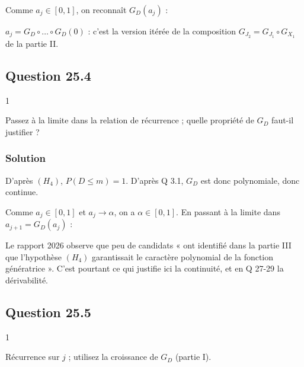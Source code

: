 \documentclass[11pt,a4paper]{article}
\newcommand{\equationajustee}[1]{%
  \sbox{\boiteequation}{$\displaystyle #1$}%
  \ifdim\wd\boiteequation>\linewidth
    \[\resizebox{\linewidth}{!}{\usebox{\boiteequation}}\]%
  \else
    \[#1\]%
  \fi}
\begin{document}
Comme \(a_j\in[0,1]\), on reconnaît \(G_D(a_j)\) :

\equationajustee{\boxed{a_{j+1}=G_D(a_j)}}

\begin{methode}

\(a_j=G_D\circ\dots\circ G_D(0)\) : c'est la version itérée de la composition \(G_{J_2}=G_{J_1}\circ G_{X_1}\) de la partie II.

\end{methode}

\hypertarget{question-25.4}{%
\subsection{Question 25.4}\label{question-25.4}}

\begin{indication}{1}

Passez à la limite dans la relation de récurrence ; quelle propriété de \(G_D\) faut-il justifier ?

\end{indication}

\hypertarget{solution-58}{%
\subsubsection{Solution}\label{solution-58}}

D'après \((H_4)\), \(P(D\le m)=1\). D'après Q 3.1, \(G_D\) est donc polynomiale, donc continue.

Comme \(a_j\in[0,1]\) et \(a_j\to\alpha\), on a \(\alpha\in[0,1]\). En passant à la limite dans \(a_{j+1}=G_D(a_j)\) :

\equationajustee{\boxed{\alpha=G_D(\alpha)}}

\begin{jury}

Le rapport 2026 observe que peu de candidats « ont identifié dans la partie III que l'hypothèse \((H_4)\) garantissait le caractère polynomial de la fonction génératrice ».
C'est pourtant ce qui justifie ici la continuité, et en Q 27-29 la dérivabilité.

\end{jury}

\hypertarget{question-25.5}{%
\subsection{Question 25.5}\label{question-25.5}}

\begin{indication}{1}

Récurrence sur \(j\) ; utilisez la croissance de \(G_D\) (partie I).

\end{indication}
\end{document}
